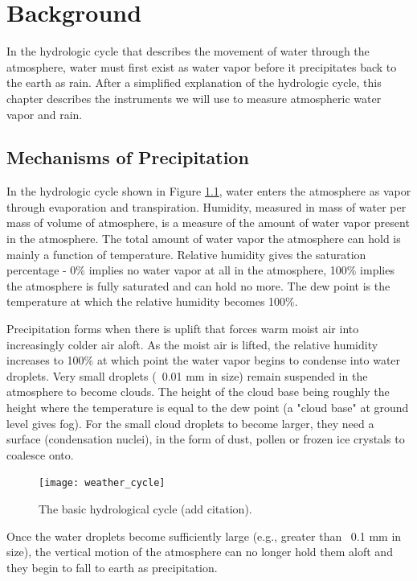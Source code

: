 \documentclass[proposal]{umassthesis}
\begin{document}
\chapter{Background}

In the hydrologic cycle that describes the movement of water through the atmosphere, water must first exist as water vapor before it precipitates back to the earth as rain. After a simplified explanation of the hydrologic cycle, this chapter describes the instruments we will use to measure atmospheric water vapor and rain.

\section{Mechanisms of Precipitation}

In the hydrologic cycle shown in Figure \ref{fig:weather_cycle}, water enters the atmosphere as vapor through evaporation and transpiration. Humidity, measured in mass of water per mass of volume of atmosphere, is a measure of the amount of water vapor present in the atmosphere. The total amount of water vapor the atmosphere can hold is mainly a function of temperature. Relative humidity gives the saturation percentage - 0\% implies no water vapor at all in the atmosphere, 100\% implies the atmosphere is fully saturated and can hold no more. The dew point is the temperature at which the relative humidity becomes 100\%.

Precipitation forms when there is uplift that forces warm moist air into increasingly colder air aloft. As the moist air is lifted, the relative humidity increases to 100\% at which point the water vapor begins to condense into water droplets. Very small droplets (~0.01 mm in size) remain suspended in the atmosphere to become clouds. The height of the cloud base being roughly the height where the temperature is equal to the dew point (a "cloud base" at ground level gives fog). For the small cloud droplets to become larger, they need a surface (condensation nuclei), in the form of dust, pollen or frozen ice crystals to coalesce onto.
\begin{figure}[!h]
\begin{center}
\texttt{[image: weather\_cycle]}
\caption{The basic hydrological cycle (add citation).}
\label{fig:weather_cycle}
\end{center}
\end{figure}
Once the water droplets become sufficiently large (e.g., greater than ~0.1 mm in size), the vertical motion of the atmosphere can no longer hold them aloft and they begin to fall to earth as precipitation.
\end{document}
